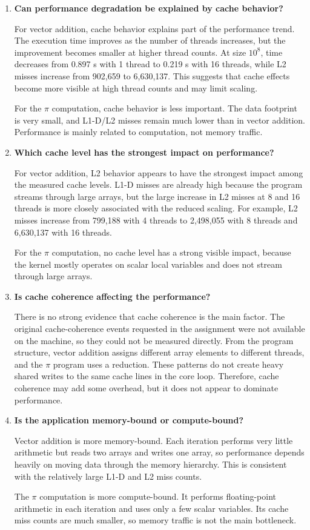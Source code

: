 \begin{enumerate}
    \item \textbf{Can performance degradation be explained by cache behavior?}

    For vector addition, cache behavior explains part of the performance trend.
    The execution time improves as the number of threads increases, but the
    improvement becomes smaller at higher thread counts. At size $10^8$, time
    decreases from 0.897 s with 1 thread to 0.219 s with 16 threads, while L2
    misses increase from 902,659 to 6,630,137. This suggests that cache effects
    become more visible at high thread counts and may limit scaling.

    For the $\pi$ computation, cache behavior is less important. The data
    footprint is very small, and L1-D/L2 misses remain much lower than in vector
    addition. Performance is mainly related to computation, not memory traffic.

    \item \textbf{Which cache level has the strongest impact on performance?}

    For vector addition, L2 behavior appears to have the strongest impact among
    the measured cache levels. L1-D misses are already high because the program
    streams through large arrays, but the large increase in L2 misses at 8 and
    16 threads is more closely associated with the reduced scaling. For example,
    L2 misses increase from 799,188 with 4 threads to 2,498,055 with 8 threads
    and 6,630,137 with 16 threads.

    For the $\pi$ computation, no cache level has a strong visible impact,
    because the kernel mostly operates on scalar local variables and does not
    stream through large arrays.

    \item \textbf{Is cache coherence affecting the performance?}

    There is no strong evidence that cache coherence is the main factor. The
    original cache-coherence events requested in the assignment were not
    available on the machine, so they could not be measured directly. From the
    program structure, vector addition assigns different array elements to
    different threads, and the $\pi$ program uses a reduction. These patterns do
    not create heavy shared writes to the same cache lines in the core loop.
    Therefore, cache coherence may add some overhead, but it does not appear to
    dominate performance.

    \item \textbf{Is the application memory-bound or compute-bound?}

    Vector addition is more memory-bound. Each iteration performs very little
    arithmetic but reads two arrays and writes one array, so performance depends
    heavily on moving data through the memory hierarchy. This is consistent with
    the relatively large L1-D and L2 miss counts.

    The $\pi$ computation is more compute-bound. It performs floating-point
    arithmetic in each iteration and uses only a few scalar variables. Its cache
    miss counts are much smaller, so memory traffic is not the main bottleneck.
\end{enumerate}
